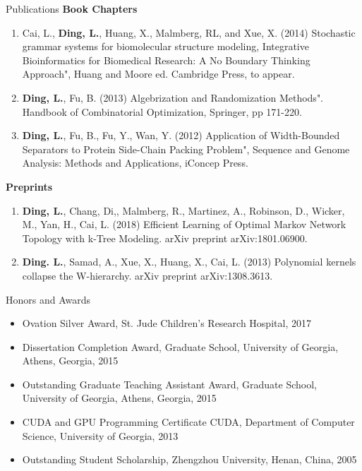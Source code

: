 \documentclass{resume} %
\begin{document}
\begin{rSection}{Publications}
\textbf{Book Chapters}
\begin{enumerate}
\item Cai, L., \textbf{Ding, L.}, Huang, X., Malmberg, RL, and Xue, X. (2014) Stochastic grammar systems for biomolecular structure modeling, Integrative Bioinformatics for Biomedical Research: A No Boundary Thinking Approach", Huang and Moore ed. Cambridge Press, to appear.

\item \textbf{Ding, L.}, Fu, B. (2013) Algebrization and Randomization Methods". Handbook of Combinatorial Optimization, Springer, pp 171-220.

\item \textbf{Ding, L.}, Fu, B., Fu, Y., Wan, Y. (2012) Application of Width-Bounded Separators to Protein Side-Chain Packing Problem", Sequence and Genome Analysis: Methods and Applications, iConcep Press.
\end{enumerate}


\textbf{Preprints}
\begin{enumerate}
\item \textbf{Ding, L.}, Chang, Di,, Malmberg, R., Martinez, A., Robinson, D., Wicker, M., Yan, H., Cai, L. (2018) Efficient Learning of Optimal Markov Network Topology with k-Tree Modeling. arXiv preprint arXiv:1801.06900.

\item \textbf{Ding. L.}, Samad, A., Xue, X., Huang, X., Cai, L. (2013) Polynomial kernels collapse the W-hierarchy. arXiv preprint arXiv:1308.3613.
\end{enumerate}
\end{rSection}


\begin{rSection}{Honors and Awards}
\begin{itemize}
\item Ovation Silver Award, St. Jude Children’s Research Hospital, 2017
\item Dissertation Completion Award, Graduate School, University of Georgia, Athens, Georgia, 2015
\item Outstanding Graduate Teaching Assistant Award,  Graduate School, University of Georgia, Athens, Georgia, 2015
\item CUDA and GPU Programming Certificate CUDA, Department of Computer Science, University of Georgia, 2013
\item Outstanding Student Scholarship, Zhengzhou University, Henan, China, 2005
\end{itemize}
\end{rSection}
\end{document}
